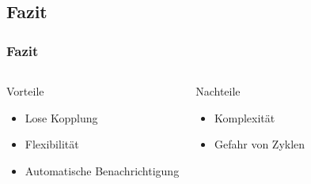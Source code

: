 \subsection{Fazit}
\begin{frame}
	\frametitle{Fazit}
	\begin{columns} 
    		\begin{exampleblock}{Vorteile}
    			\begin{itemize}
    				\item Lose Kopplung
    				\item Flexibilität
    				\item Automatische Benachrichtigung
    			\end{itemize}
    		\end{exampleblock}
    		\begin{alertblock}{Nachteile}
    			\begin{itemize}
    				\item Komplexität
    				\item Gefahr von Zyklen
    			\end{itemize}
    		\end{alertblock}
  	\end{columns}   	  		
\end{frame}